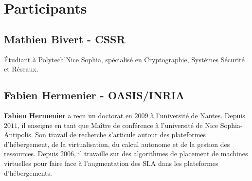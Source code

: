 \documentclass[a4paper]{article}
\begin{document}
\section{Participants}
\subsection{Mathieu Bivert - CSSR}
Étudiant à Polytech'Nice Sophia, spécialisé en Cryptographie, Systèmes
Sécurité et Réseaux.

\subsection{Fabien Hermenier - OASIS/INRIA}
\textbf{Fabien Hermenier} a recu un doctorat en $2009$ à l'université
de Nantes. Depuis $2011$, il enseigne en tant que Maître de conférence
à l'université de Nice Sophia-Antipolis. Son travail de recherche
s'articule autour des plateformes d'hébergement, de la virtualisation,
du calcul autonome et de la gestion des ressources. Depuis $2006$, il
travaille sur des algorithmes de placement de machines virtuelles pour
faire face à l'augmentation des SLA dans les plateformes d'hébergements.

\newpage
{}


\end{document}

